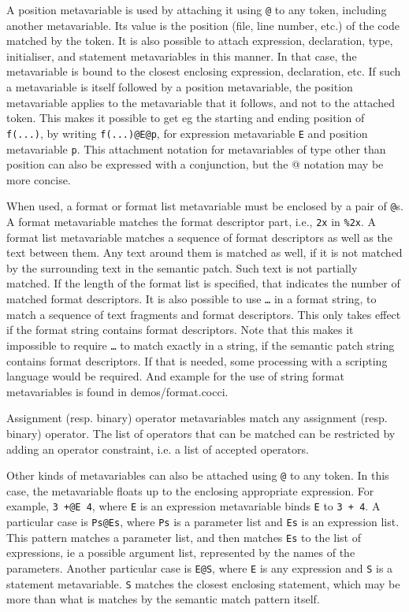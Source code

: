 A position metavariable is used by attaching it using \texttt{@} to any
token, including another metavariable.  Its value is the position (file,
line number, etc.) of the code matched by the token.  It is also possible
to attach expression, declaration, type, initialiser, and statement
metavariables in this manner.  In that case, the metavariable is bound to
the closest enclosing expression, declaration, etc.  If such a metavariable
is itself followed by a position metavariable, the position metavariable
applies to the metavariable that it follows, and not to the attached token.
This makes it possible to get eg the starting and ending position of {\tt
  f(...)}, by writing {\tt f(...)@E@p}, for expression metavariable {\tt E}
and position metavariable {\tt p}. This attachment notation for
metavariables of type other than position can also be expressed with a
conjunction, but the @ notation may be more concise.

When used, a format or format list metavariable must be enclosed by a pair
of \texttt{@}s.  A format metavariable matches the format descriptor part,
i.e., \texttt{2x} in \texttt{\%2x}.  A format list metavariable matches a
sequence of format descriptors as well as the text between them.  Any text
around them is matched as well, if it is not matched by the surrounding
text in the semantic patch.  Such text is not partially matched.  If the
length of the format list is specified, that indicates the number of
matched format descriptors.  It is also possible to use \texttt{\ldots} in
a format string, to match a sequence of text fragments and format
descriptors.  This only takes effect if the format string contains format
descriptors.  Note that this makes it impossible to require \texttt{\ldots}
to match exactly in a string, if the semantic patch string contains format
descriptors.  If that is needed, some processing with a scripting language
would be required.  And example for the use of string format metavariables
is found in demos/format.cocci.

Assignment (resp. binary) operator metavariables match any assignment
(resp. binary) operator. The list of operators that can be matched can
be restricted by adding an operator constraint, i.e. a list of accepted
operators.

Other kinds of metavariables can also be attached using \texttt{@} to any
token.  In this case, the metavariable floats up to the enclosing
appropriate expression.  For example, {\tt 3 +@E 4}, where {\tt E} is an
expression metavariable binds {\tt E} to {\tt 3 + 4}.  A particular case is
{\tt Ps@Es}, where {\tt Ps} is a parameter list and {\tt Es} is an
expression list.  This pattern matches a parameter list, and then matches
{\tt Es} to the list of expressions, ie a possible argument list,
represented by the names of the parameters.  Another particular case is
{\tt E@S}, where {\tt E} is any expression and {\tt S} is a statement
metavariable.  {\tt S} matches the closest enclosing statement, which may
be more than what is matches by the semantic match pattern itself.

